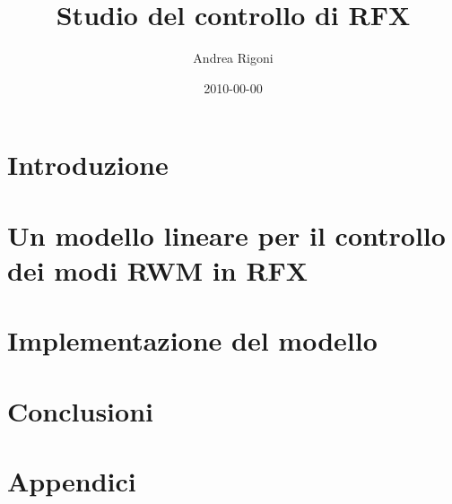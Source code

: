 \documentclass[italian,a4paper,10pt]{article}
\author{Andrea Rigoni}
\title{Studio del controllo di RFX}
\date{2010-00-00}
\begin{document}
\maketitle

\newpage
\section{Introduzione}


\newpage
\section{Un modello lineare per il controllo dei modi RWM in RFX}

\newpage
\section{Implementazione del modello}

\newpage
\section{Conclusioni}
\newpage
\section{Appendici}
\appendix

\newpage


\end{document}
